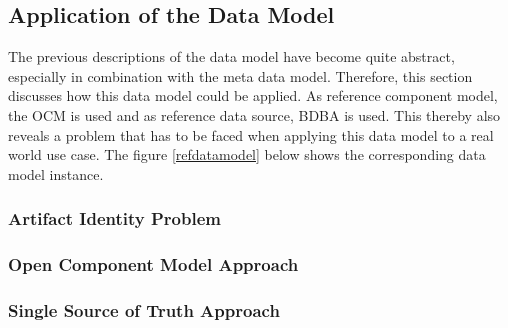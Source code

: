 \subsection{Application of the Data Model}
The previous descriptions of the data model have become quite abstract, especially in combination with the meta data model. Therefore, this section discusses how this data model could be applied. As reference component model, the OCM is used and as reference data source, BDBA is used. This thereby also reveals a problem that has to be faced when applying this data model to a real world use case. The figure \ref{refdatamodel} below shows the corresponding data model instance.\par

 


\subsubsection{Artifact Identity Problem}
\subsubsection{Open Component Model Approach}
\subsubsection{Single Source of Truth Approach}

 



